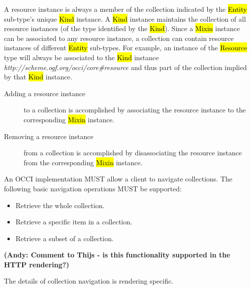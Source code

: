 \documentclass[10pt,a4paper]{article}
\begin{document}
A resource instance is always a member of the collection indicated by the
\hl{Entity} sub-type's unique \hl{Kind} instance. A \hl{Kind} instance maintains
the collection of all resource instances (of the type identified by the
\hl{Kind}).
%
Since a \hl{Mixin} instance can be associated to any resource instance, a
collection can contain resource instances of different \hl{Entity} sub-types.
%
For example, an instance of the \hl{Resource} type will always be associated
to the \hl{Kind} instance
\textit{http://scheme.ogf.org/occi/core\#resource} and thus part of the
collection implied by that \hl{Kind} instance.
\begin{description}
\item[Adding a resource instance] to a collection is accomplished by associating the
 resource instance to the corresponding \hl{Mixin} instance.
\item[Removing a resource instance] from a collection is accomplished by disassociating
 the resource instance from the corresponding \hl{Mixin} instance.
\end{description}
%
An OCCI implementation MUST allow a client to navigate collections. The
following basic navigation operations MUST be supported:
\begin{itemize}
\item Retrieve the whole collection.
\item Retrieve a specific item in a collection.
\item Retrieve a subset of a collection.
\end{itemize}

\textbf{(Andy: Comment to Thijs - is this functionality supported in the HTTP rendering?)}

The details of collection navigation is rendering specific.
\end{document}
